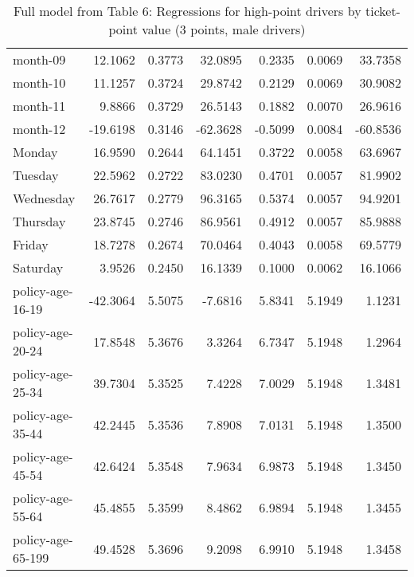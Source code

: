 \documentclass[10pt]{article}
\begin{document}
\begin{table}[ht]
\begin{tabular}{lrrrrrr}
  month-09 & 12.1062 & 0.3773 & 32.0895 & 0.2335 & 0.0069 & 33.7358 \\ 
  month-10 & 11.1257 & 0.3724 & 29.8742 & 0.2129 & 0.0069 & 30.9082 \\ 
  month-11 & 9.8866 & 0.3729 & 26.5143 & 0.1882 & 0.0070 & 26.9616 \\ 
  month-12 & -19.6198 & 0.3146 & -62.3628 & -0.5099 & 0.0084 & -60.8536 \\ 
  Monday & 16.9590 & 0.2644 & 64.1451 & 0.3722 & 0.0058 & 63.6967 \\ 
  Tuesday & 22.5962 & 0.2722 & 83.0230 & 0.4701 & 0.0057 & 81.9902 \\ 
  Wednesday & 26.7617 & 0.2779 & 96.3165 & 0.5374 & 0.0057 & 94.9201 \\ 
  Thursday & 23.8745 & 0.2746 & 86.9561 & 0.4912 & 0.0057 & 85.9888 \\ 
  Friday & 18.7278 & 0.2674 & 70.0464 & 0.4043 & 0.0058 & 69.5779 \\ 
  Saturday & 3.9526 & 0.2450 & 16.1339 & 0.1000 & 0.0062 & 16.1066 \\ 
  policy-age-16-19 & -42.3064 & 5.5075 & -7.6816 & 5.8341 & 5.1949 & 1.1231 \\ 
  policy-age-20-24 & 17.8548 & 5.3676 & 3.3264 & 6.7347 & 5.1948 & 1.2964 \\ 
  policy-age-25-34 & 39.7304 & 5.3525 & 7.4228 & 7.0029 & 5.1948 & 1.3481 \\ 
  policy-age-35-44 & 42.2445 & 5.3536 & 7.8908 & 7.0131 & 5.1948 & 1.3500 \\ 
  policy-age-45-54 & 42.6424 & 5.3548 & 7.9634 & 6.9873 & 5.1948 & 1.3450 \\ 
  policy-age-55-64 & 45.4855 & 5.3599 & 8.4862 & 6.9894 & 5.1948 & 1.3455 \\ 
  policy-age-65-199 & 49.4528 & 5.3696 & 9.2098 & 6.9910 & 5.1948 & 1.3458 \\ 
   \hline
\end{tabular}
\caption{Full model from Table 6: Regressions for high-point drivers by ticket-point value (3 points, male drivers)} 
\label{tab_6_3_pts_M}
\end{table}


\clearpage
\pagebreak



\end{document}
